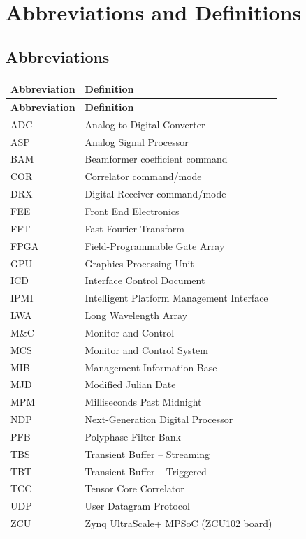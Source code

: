 
\chapter{Abbreviations and Definitions}
\label{sec:abbreviations}

\section{Abbreviations}

\begin{longtable}{p{3cm}p{10cm}}
    \toprule
    \textbf{Abbreviation} & \textbf{Definition} \\
    \midrule
    \endfirsthead

    \toprule
    \textbf{Abbreviation} & \textbf{Definition} \\
    \midrule
    \endhead

    \bottomrule
    \endfoot

    ADC & Analog-to-Digital Converter \\
    ASP & Analog Signal Processor \\
    BAM & Beamformer coefficient command \\
    COR & Correlator command/mode \\
    DRX & Digital Receiver command/mode \\
    FEE & Front End Electronics \\
    FFT & Fast Fourier Transform \\
    FPGA & Field-Programmable Gate Array \\
    GPU & Graphics Processing Unit \\
    ICD & Interface Control Document \\
    IPMI & Intelligent Platform Management Interface \\
    LWA & Long Wavelength Array \\
    M\&C & Monitor and Control \\
    MCS & Monitor and Control System \\
    MIB & Management Information Base \\
    MJD & Modified Julian Date \\
    MPM & Milliseconds Past Midnight \\
    NDP & Next-Generation Digital Processor \\
    PFB & Polyphase Filter Bank \\
    TBS & Transient Buffer -- Streaming \\
    TBT & Transient Buffer -- Triggered \\
    TCC & Tensor Core Correlator \\
    UDP & User Datagram Protocol \\
    ZCU & Zynq UltraScale+ MPSoC (ZCU102 board) \\

\end{longtable}

